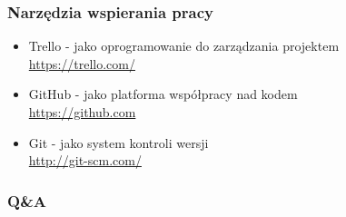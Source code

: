 \documentclass{beamer}
\begin{document}
\begin{frame}
\frametitle{Narzędzia wspierania pracy}
\begin{itemize}
\item Trello - jako oprogramowanie do zarządzania projektem \\
  \href{https://trello.com/}{https://trello.com/}
\item GitHub - jako platforma współpracy nad kodem \\
  \href{https://github.com}{https://github.com}
\item Git - jako system kontroli wersji \\
  \href{http://git-scm.com/}{http://git-scm.com/}
\end{itemize}
\end{frame}

\begin{frame}
\frametitle{Q\&A}
\end{frame}
\end{document}
